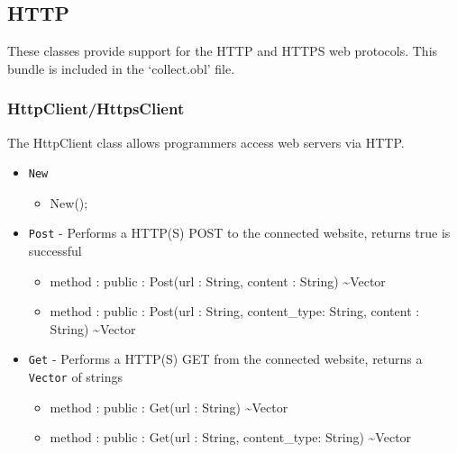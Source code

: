 \documentclass[11pt]{article}
\begin{document}
\subsection{HTTP}
These classes provide support for the HTTP and HTTPS web protocols.  This bundle is included in the `collect.obl' file.

\subsubsection{HttpClient/HttpsClient}
The HttpClient class allows programmers access web servers via HTTP.
\begin{itemize}
\item \texttt{New}
  \begin{itemize}
  \item New();
  \end{itemize}
  
\item \texttt{Post} - Performs a HTTP(S) POST to the connected website,
  returns true is successful
  \begin{itemize}
  \item method : public : Post(url : String, content : String) \textasciitilde Vector
  \item method : public : Post(url : String, content\_type: String, content : String) \textasciitilde Vector
  \end{itemize}

\item \texttt{Get} - Performs a HTTP(S) GET from the connected website,
  returns a \texttt{Vector} of strings
  \begin{itemize}
  \item method : public : Get(url : String) \textasciitilde Vector
  \item method : public : Get(url : String, content\_type: String) \textasciitilde Vector
  \end{itemize}


\end{itemize}
\end{document}
